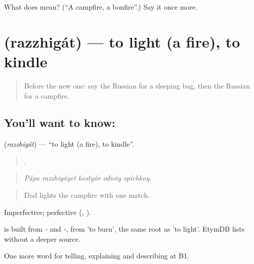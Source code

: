 \begin{tcolorbox}[breakable,colback=teal!4,colframe=teal!35!black,title={Before you move on}]
What does  mean? (\textquotedblleft{}A campfire, a bonfire\textquotedblright{}.) Say it once more.
\end{tcolorbox}
\section[\texorpdfstring{\ru{разжигать} (razzhigát)}{разжигать (razzhigát)}]{ (razzhigát) — to light (a fire), to kindle}

\label{lesson:RU-C462-razzhigat}



\begin{quote}
Before the new one: say the Russian for a sleeping bag, then the Russian for a campfire.
\end{quote}

\subsection*{You'll want to know: }
\textbf{} (\emph{razzhigát}) — \textquotedblleft{}to light (a fire), to kindle\textquotedblright{}.

\begin{quote}
    .
\end{quote}

\begin{quote}
\emph{Pápa razzhigáyet kostyór odnóy spíchkoy.}
\end{quote}

\begin{quote}
Dad lights the campfire with one match.
\end{quote}

Imperfective; perfective \emph{} (\emph{, }).

\begin{cousinweb}
\emph{} is built from \emph{-} and \emph{-}, from \emph{} 'to burn', the same root as \emph{} 'to light'. EtymDB lists \emph{} without a deeper source.
\end{cousinweb}

\begin{grammarlens}[title={What you've built}]
One more word for telling, explaining and describing at B1.
\end{grammarlens}

